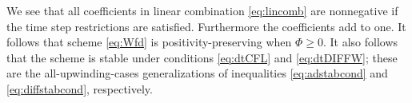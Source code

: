 \documentclass[11pt,final]{amsart}%
\begin{document}
We see that all coefficients in linear combination \eqref{eq:lincomb} are nonnegative if the time step restrictions are satisfied.  Furthermore the coefficients add to one.  It follows \citep{MortonMayers} that scheme \eqref{eq:Wfd} is positivity-preserving when $\Phi\ge 0$.  It also follows that the scheme is stable under conditions \eqref{eq:dtCFL} and \eqref{eq:dtDIFFW}; these are the all-upwinding-cases generalizations of inequalities \eqref{eq:adstabcond} and \eqref{eq:diffstabcond}, respectively.
\end{document}
